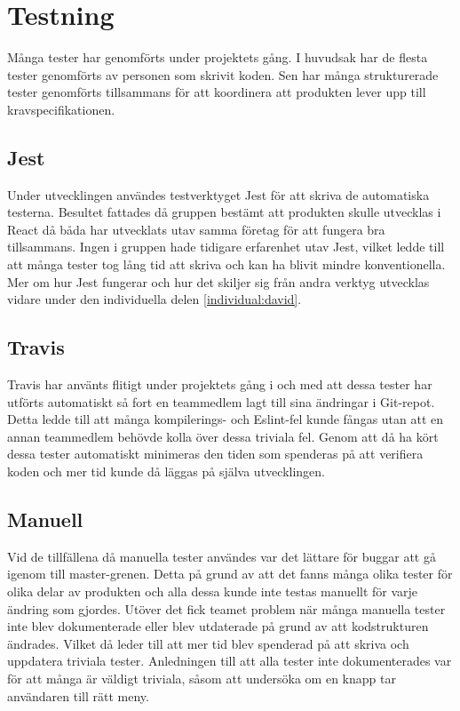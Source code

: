 \section{Testning}
Många tester har genomförts under projektets gång. I huvudsak har de flesta tester genomförts av personen som skrivit koden. Sen har många strukturerade tester genomförts tillsammans för att koordinera att produkten lever upp till kravspecifikationen. 

\subsection{Jest}
Under utvecklingen användes testverktyget Jest för att skriva de automatiska testerna. Besultet fattades då gruppen bestämt att produkten skulle utvecklas i React då båda har utvecklats utav samma företag för att fungera bra tillsammans. Ingen i gruppen hade tidigare erfarenhet utav Jest, vilket ledde till att många tester tog lång tid att skriva och kan ha blivit mindre konventionella. Mer om hur Jest fungerar och hur det skiljer sig från andra verktyg utvecklas vidare under den individuella delen \ref{individual:david}.

\subsection{Travis}
Travis har använts flitigt under projektets gång i och med att dessa tester har utförts automatiskt så fort en teammedlem lagt till sina ändringar i Git-repot. Detta ledde till att många kompilerings- och Eslint-fel kunde fångas utan att en annan teammedlem behövde kolla över dessa triviala fel. Genom att då ha kört dessa tester automatiskt minimeras den tiden som spenderas på att verifiera koden och mer tid kunde då läggas på själva utvecklingen. 

\subsection{Manuell}
Vid de tillfällena då manuella tester användes var det lättare för buggar att gå igenom till master-grenen. Detta på grund av att det fanns många olika tester för olika delar av produkten och alla dessa kunde inte testas manuellt för varje ändring som gjordes. Utöver det fick teamet problem när många manuella tester inte blev dokumenterade eller blev utdaterade på grund av att kodstrukturen ändrades. Vilket då leder till att mer tid blev spenderad på att skriva och uppdatera triviala tester. Anledningen till att alla tester inte dokumenterades var för att många är väldigt triviala, såsom att undersöka om en knapp tar användaren till rätt meny. 
